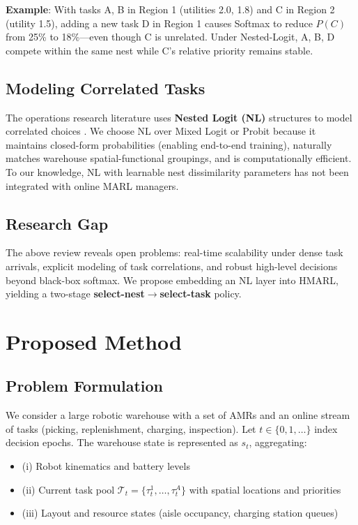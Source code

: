 \documentclass[12pt,a4paper]{article}
\begin{document}
\textbf{Example}: With tasks A, B in Region 1 (utilities 2.0, 1.8) and C in Region 2 (utility 1.5), adding a new task D in Region 1 causes Softmax to reduce $P(C)$ from 25\% to 18\%---even though C is unrelated. Under Nested-Logit, A, B, D compete within the same nest while C's relative priority remains stable.

\subsection{Modeling Correlated Tasks}

The operations research literature uses \textbf{Nested Logit (NL)} structures to model correlated choices \citep{train2009discrete}. We choose NL over Mixed Logit or Probit because it maintains closed-form probabilities (enabling end-to-end training), naturally matches warehouse spatial-functional groupings, and is computationally efficient. To our knowledge, NL with learnable nest dissimilarity parameters has not been integrated with online MARL managers.

\subsection{Research Gap}

The above review reveals open problems: real-time scalability under dense task arrivals, explicit modeling of task correlations, and robust high-level decisions beyond black-box softmax. We propose embedding an NL layer into HMARL, yielding a two-stage \textbf{select-nest$\to$select-task} policy.

\section{Proposed Method}

\subsection{Problem Formulation}

We consider a large robotic warehouse with a set of AMRs and an online stream of tasks (picking, replenishment, charging, inspection). Let $t \in \{0,1,\dots\}$ index decision epochs. The warehouse state is represented as $s_t$, aggregating:
\begin{itemize}
\item (i) Robot kinematics and battery levels
\item (ii) Current task pool $\mathcal{T}_t = \{\tau^1_t, \dots, \tau^{A}_t\}$ with spatial locations and priorities
\item (iii) Layout and resource states (aisle occupancy, charging station queues)
\end{itemize}
\end{document}
